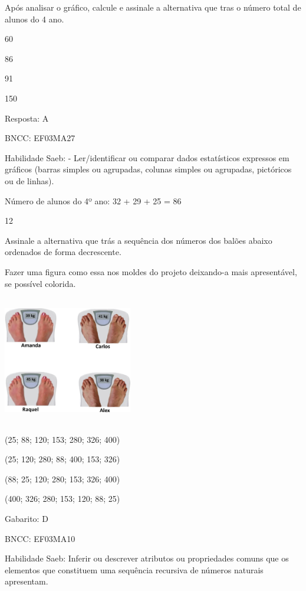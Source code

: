 \begin{escolha}
\begin{escolha}
Após analisar o gráfico, calcule e assinale a alternativa que tras o
número total de alunos do 4 ano.

\begin{escolha}
\item
  60
\item
  86
\item
  91
\item
  150
\end{escolha}

Resposta: A

BNCC: EF03MA27

Habilidade Saeb: - Ler/identificar ou comparar dados estatísticos
expressos em gráficos (barras simples ou agrupadas, colunas simples ou
agrupadas, pictóricos ou de linhas).

Número de alunos do 4º ano: 32 + 29 + 25 = 86

\num{12}

Assinale a alternativa que trás a sequência dos números dos balões
abaixo ordenados de forma decrescente.

Fazer uma figura como essa nos moldes do projeto deixando-a mais
apresentável, se possível colorida.

\includegraphics[width=2.21686in,height=2.20852in]{media/image113.png}

\begin{escolha}
\item
  (25; 88; 120; 153; 280; 326; 400)
\item
  (25; 120; 280; 88; 400; 153; 326)
\item
  (88; 25; 120; 280; 153; 326; 400)
\item
  (400; 326; 280; 153; 120; 88; 25)
\end{escolha}

Gabarito: D

BNCC: EF03MA10

Habilidade Saeb: Inferir ou descrever atributos ou propriedades comuns
que os elementos que constituem uma sequência recursiva de números
naturais apresentam.


\end{escolha}
\end{escolha}
